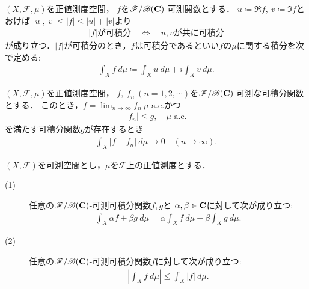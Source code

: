 	\begin{screen}
		\begin{dfn}[複素数値可測関数の正値測度に関する積分]
			$(X,\mathscr{F},\mu)$を正値測度空間，
			$f$を$\mathscr{F}/\mathscr{B}(\mathbf{C})$-可測関数とする．
			$u \coloneqq \Re{f},\ v \coloneqq \Im{f}$とおけば
			$|u|,|v| \leq |f| \leq |u| + |v|$より
			\begin{align}
				\mbox{$|f|$が可積分} \quad \Longleftrightarrow \quad
				\mbox{$u,v$が共に可積分}
			\end{align}
			が成り立つ．$|f|$が可積分のとき，$f$は可積分であるといい$f$の$\mu$に関する積分を次で定める:
			\begin{align}
				\int_X f\ d\mu
				\coloneqq \int_X u\ d\mu + i \int_X v\ d\mu.
			\end{align}
		\end{dfn}
	\end{screen}
	
	\begin{screen}
		\begin{thm}[Lebesgueの収束定理]
			$(X,\mathscr{F},\mu)$を正値測度空間，
			$f,\ f_n\ (n=1,2,\cdots)$を$\mathscr{F}/\mathscr{B}(\mathbf{C})$-可測な可積分関数とする．
			このとき，$f = \lim_{n \to \infty} f_n\ \mbox{$\mu$-a.e.}$かつ
			\begin{align}
				|f_n| \leq g, \quad \mbox{$\mu$-a.e.}
			\end{align}
			を満たす可積分関数$g$が存在するとき
			\begin{align}
				\int_X |f - f_n|\ d\mu \longrightarrow 0
				\quad (n \longrightarrow \infty).
			\end{align}
		\end{thm}
	\end{screen}
	
	\begin{screen}
		\begin{thm}
			$(X,\mathscr{F})$を可測空間とし，$\mu$を$\mathscr{F}$上の正値測度とする．
			\begin{description}
				\item[(1)] 任意の$\mathscr{F}/\mathscr{B}(\mathbf{C})$-可測可積分関数$f,g$と
					$\alpha,\beta \in \mathbf{C}$に対して次が成り立つ:
					\begin{align}
						\int_X \alpha f + \beta g\ d\mu
						= \alpha \int_X f\ d\mu + \beta \int_X g\ d\mu.
					\end{align}
					
				\item[(2)] 任意の$\mathscr{F}/\mathscr{B}(\mathbf{C})$-可測可積分関数$f$に対して次が成り立つ:
					\begin{align}
						\left| \int_X f\ d\mu \right| \leq \int_X |f|\ d\mu.
					\end{align}
			\end{description}	
		\end{thm}
	\end{screen}
	
